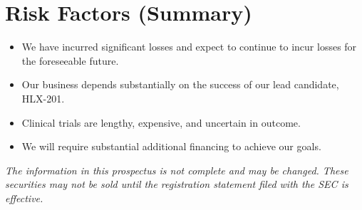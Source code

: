 \section{Risk Factors (Summary)}
\begin{itemize}[leftmargin=1.3em,itemsep=2pt]
  \item We have incurred significant losses and expect to continue to incur losses for the
        foreseeable future.
  \item Our business depends substantially on the success of our lead candidate, HLX-201.
  \item Clinical trials are lengthy, expensive, and uncertain in outcome.
  \item We will require substantial additional financing to achieve our goals.
\end{itemize}

\vspace{6pt}
\begin{center}\footnotesize\itshape
The information in this prospectus is not complete and may be changed. These securities may
not be sold until the registration statement filed with the SEC is effective.
\end{center}
